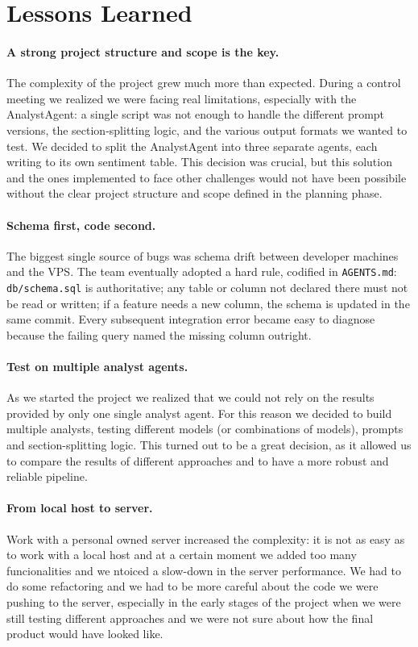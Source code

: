 \section{Lessons Learned}

\paragraph{A strong project structure and scope is the key.} The complexity of the project grew much more than expected. During a control meeting we realized we were facing real limitations, especially with the AnalystAgent: a single script was not enough to handle the different prompt versions, the section-splitting logic, and the various output formats we wanted to test. We decided to split the AnalystAgent into three separate agents, each writing to its own sentiment table. This decision was crucial, but this solution and the ones implemented to face other challenges would not have been possibile without the clear project structure and scope defined in the planning phase.

\paragraph{Schema first, code second.} The biggest single source of bugs was schema drift between developer machines and the VPS. The team eventually adopted a hard rule, codified in \texttt{AGENTS.md}: \texttt{db/schema.sql} is authoritative; any table or column not declared there must not be read or written; if a feature needs a new column, the schema is updated in the same commit. Every subsequent integration error became easy to diagnose because the failing query named the missing column outright.

\paragraph{Test on multiple analyst agents.} As we started the project we realized that we could not rely on the results provided by only one single analyst agent. For this reason we decided to build multiple analysts, testing different models (or combinations of models), prompts and section-splitting logic. This turned out to be a great decision, as it allowed us to compare the results of different approaches and to have a more robust and reliable pipeline. 

\paragraph{From local host to server.} Work with a personal owned server increased the complexity: it is not as easy as to work with a local host and at a certain moment we added too many funcionalities and we ntoiced a slow-down in the server performance. We had to do some refactoring and we had to be more careful about the code we were pushing to the server, especially in the early stages of the project when we were still testing different approaches and we were not sure about how the final product would have looked like.


